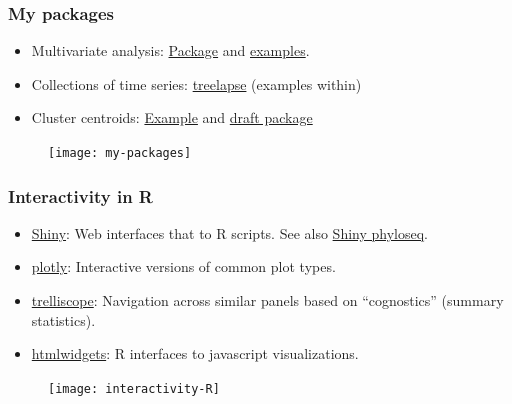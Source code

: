 \documentclass{beamer}
\begin{document}
\begin{frame}
  \frametitle{My packages}

\begin{itemize}
\item Multivariate analysis: \href{https://github.com/krisrs1128/mvarVis}{Package} and
  \href{http://statweb.stanford.edu/~kriss1/mvarVis\_d3\_examples.html}{examples}.
\item Collections of time series:
  \href{https://krisrs1128.github.io/treelapse/}{treelapse} (examples within)
\item Cluster centroids: \href{http://statweb.stanford.edu/~kriss1/hclust.html}{Example}
  and \href{https://github.com/krisrs1128/centroidview}{draft package}
\end{itemize}
\begin{figure}
  \centering
  \texttt{[image: my-packages]}
\end{figure}


\end{frame}
\begin{frame}
  \frametitle{Interactivity in R}

\begin{itemize}
\item \href{https://shiny.rstudio.com/gallery/}{Shiny}: Web interfaces that to R
  scripts. See also
  \href{http://joey711.github.io/shiny-phyloseq/}{Shiny phyloseq}.
\item \href{https://plot.ly/r/}{plotly}: Interactive versions of common plot types.
\item \href{http://deltarho.org/docs-trelliscope/}{trelliscope}: Navigation
  across similar panels based on ``cognostics'' (summary statistics).
\item \href{http://gallery.htmlwidgets.org/}{htmlwidgets}: R interfaces to
  javascript visualizations.
\end{itemize}
\begin{figure}
  \centering
  \texttt{[image: interactivity-R]}
\end{figure}

\end{frame}
\end{document}
